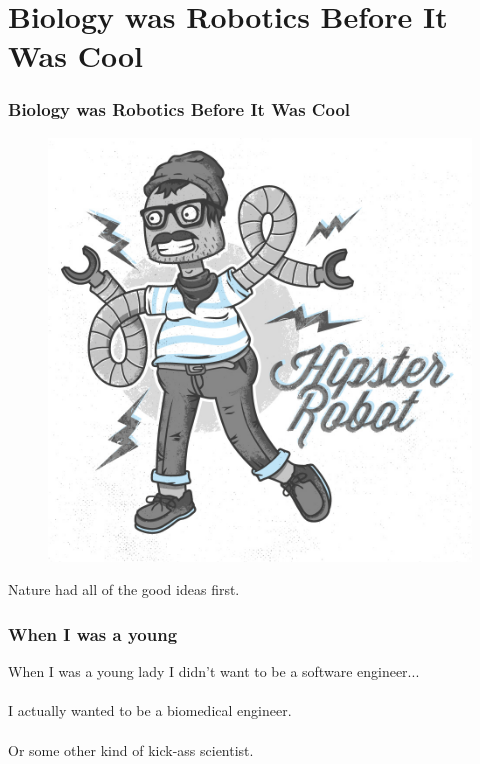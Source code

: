 \documentclass[compress]{beamer}
\begin{document}
\section{Biology was Robotics Before It Was Cool}
\begin{frame}
  \frametitle{Biology was Robotics Before It Was Cool}
    \begin{figure}
     \includegraphics[width=0.5\linewidth]{hipster.jpg}
   \end{figure}
   \begin{center}
   Nature had all of the good ideas first.
   \end{center}
\end{frame}
\begin{frame}
  \frametitle{When I was a young}
  \begin{huge}
    When I was a young lady I didn't want to be a software engineer...
    \\~\\    
    I actually wanted to be a biomedical engineer.
    \\~\\
    Or some other kind of kick-ass scientist.
  \end{huge}
\end{frame}
\end{document}
